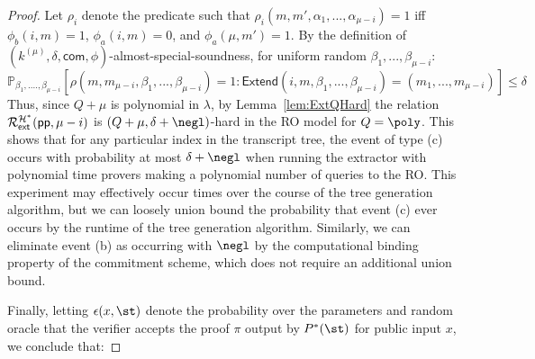 \begin{proof}
	 
	 Let $\rho_i$ denote the predicate such that $\rho_i(m, m', \alpha_1,...,\alpha_{\mu - i}) = 1 $ iff $\phi_b(i, m) = 1$, $\phi_a(i, m) = 0$, and $\phi_a(\mu, m') = 1$. By the definition of $(k^{(\mu)}, \delta, \textsf{com} , \phi)$-almost-special-soundness, for uniform random $\beta_1,...,\beta_{\mu -i}$: 
	 $$\mathbb{P}_{\beta_1,....,\beta_{\mu -i}}[\rho(m, m_{\mu - i},\beta_1,...,\beta_{\mu - i}) = 1 : \textsf{Extend}(i,m,\beta_1,...,\beta_{\mu-i}) = (m_1,...,m_{\mu - i})] \leq \delta $$ 
	 Thus, since $Q+\mu$ is polynomial in $\lambda$, by Lemma~\ref{lem:ExtQHard} the relation $\mathcal{R}^{\mathcal{H^*}}_\textsf{ext}(\textsf{pp}, \mu - i)$ is $(Q+\mu, \delta + \negl)$-hard in the RO model for $Q = \poly$. This shows that for any particular index in the transcript tree, the event of type (c) occurs with probability at most $\delta +\negl$ when running the extractor with polynomial time provers making a polynomial number of queries to the RO. This experiment may effectively occur times over the course of the tree generation algorithm, but we can loosely union bound the probability that event (c) ever occurs by the runtime of the tree generation algorithm. Similarly, we can eliminate event (b) as occurring with $\negl$ by the computational binding property of the commitment scheme, which does not require an additional union bound.  
	 
	 Finally, letting $\epsilon(x, \st)$ denote the probability over the parameters and random oracle that the verifier accepts the proof $\pi$ output by $P^*(\st)$ for public input $x$, we conclude that: 
	

\end{proof}
